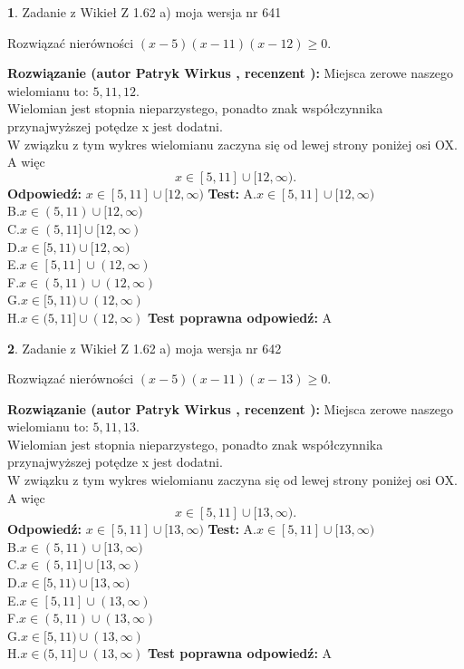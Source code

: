 \documentclass[12pt, a4paper]{article}
\theoremstyle{definition} %
\newtheorem{zad}{}
\newcommand{\zadStart}[1]{\begin{zad}#1\newline}
\newcommand{\zadStop}{\end{zad}}
\newcommand{\rozwStart}[2]{\noindent \textbf{Rozwiązanie (autor #1 , recenzent #2): }\newline}
\newcommand{\rozwStop}{\newline}
\newcommand{\odpStart}{\noindent \textbf{Odpowiedź:}\newline}
\newcommand{\odpStop}{\newline}
\newcommand{\testStart}{\noindent \textbf{Test:}\newline}
\newcommand{\testStop}{\newline}
\newcommand{\kluczStart}{\noindent \textbf{Test poprawna odpowiedź:}\newline}
\newcommand{\kluczStop}{\newline}
\begin{document}
\zadStart{Zadanie z Wikieł Z 1.62 a) moja wersja nr 641}

Rozwiązać nierówności $(x-5)(x-11)(x-12)\ge0$.
\zadStop
\rozwStart{Patryk Wirkus}{}
Miejsca zerowe naszego wielomianu to: $5, 11, 12$.\\
Wielomian jest stopnia nieparzystego, ponadto znak współczynnika przy\linebreak najwyższej potędze x jest dodatni.\\ W związku z tym wykres wielomianu zaczyna się od lewej strony poniżej osi OX. A więc $$x \in [5,11] \cup [12,\infty).$$
\rozwStop
\odpStart
$x \in [5,11] \cup [12,\infty)$
\odpStop
\testStart
A.$x \in [5,11] \cup [12,\infty)$\\
B.$x \in (5,11) \cup [12,\infty)$\\
C.$x \in (5,11] \cup [12,\infty)$\\
D.$x \in [5,11) \cup [12,\infty)$\\
E.$x \in [5,11] \cup (12,\infty)$\\
F.$x \in (5,11) \cup (12,\infty)$\\
G.$x \in [5,11) \cup (12,\infty)$\\
H.$x \in (5,11] \cup (12,\infty)$
\testStop
\kluczStart
A
\kluczStop



\zadStart{Zadanie z Wikieł Z 1.62 a) moja wersja nr 642}

Rozwiązać nierówności $(x-5)(x-11)(x-13)\ge0$.
\zadStop
\rozwStart{Patryk Wirkus}{}
Miejsca zerowe naszego wielomianu to: $5, 11, 13$.\\
Wielomian jest stopnia nieparzystego, ponadto znak współczynnika przy\linebreak najwyższej potędze x jest dodatni.\\ W związku z tym wykres wielomianu zaczyna się od lewej strony poniżej osi OX. A więc $$x \in [5,11] \cup [13,\infty).$$
\rozwStop
\odpStart
$x \in [5,11] \cup [13,\infty)$
\odpStop
\testStart
A.$x \in [5,11] \cup [13,\infty)$\\
B.$x \in (5,11) \cup [13,\infty)$\\
C.$x \in (5,11] \cup [13,\infty)$\\
D.$x \in [5,11) \cup [13,\infty)$\\
E.$x \in [5,11] \cup (13,\infty)$\\
F.$x \in (5,11) \cup (13,\infty)$\\
G.$x \in [5,11) \cup (13,\infty)$\\
H.$x \in (5,11] \cup (13,\infty)$
\testStop
\kluczStart
A
\kluczStop
\end{document}
